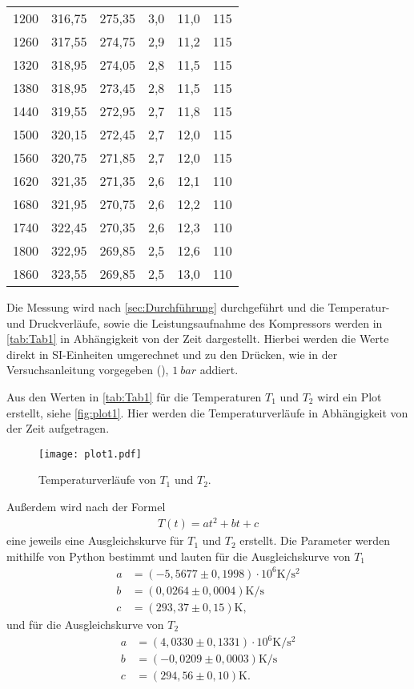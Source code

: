 \begin{table}[H]
\begin{tabular}{S[table-format=4.0] S S S[table-format=1.1] S[table-format=2.1] S[table-format=3.0]}
      1200 & 316,75 & 275,35 & 3,0 & 11,0 & 115\\
      1260 & 317,55 & 274,75 & 2,9 & 11,2 & 115\\
      1320 & 318,95 & 274,05 & 2,8 & 11,5 & 115\\
      1380 & 318,95 & 273,45 & 2,8 & 11,5 & 115\\
      1440 & 319,55 & 272,95 & 2,7 & 11,8 & 115\\
      1500 & 320,15 & 272,45 & 2,7 & 12,0 & 115\\
      1560 & 320,75 & 271,85 & 2,7 & 12,0 & 115\\
      1620 & 321,35 & 271,35 & 2,6 & 12,1 & 110\\
      1680 & 321,95 & 270,75 & 2,6 & 12,2 & 110\\
      1740 & 322,45 & 270,35 & 2,6 & 12,3 & 110\\
      1800 & 322,95 & 269,85 & 2,5 & 12,6 & 110\\
      1860 & 323,55 & 269,85 & 2,5 & 13,0 & 110\\
    \bottomrule
  \end{tabular}
\end{table}

Die Messung wird nach \autoref{sec:Durchführung} durchgeführt und die Temperatur- und Druckverläufe, sowie die Leistungsaufnahme des Kompressors
werden in \autoref{tab:Tab1} in Abhängigkeit von der Zeit dargestellt.
Hierbei werden die Werte direkt in SI-Einheiten umgerechnet und zu den Drücken, wie in der Versuchsanleitung vorgegeben (\cite{V206}),
$\qty{1}{bar}$ addiert.

Aus den Werten in \autoref{tab:Tab1} für die Temperaturen $T_1$ und $T_2$ wird ein Plot erstellt, siehe \autoref{fig:plot1}.
Hier werden die Temperaturverläufe in Abhängigkeit von der Zeit aufgetragen.

\begin{figure}
  \centering
  \texttt{[image: plot1.pdf]}
  \caption{Temperaturverläufe von $T_1$ und $T_2$.}
  \label{fig:plot1}
\end{figure}

Außerdem wird nach der Formel
\begin{align*}
  T(t)=at^2+bt+c
\end{align*}
eine jeweils eine Ausgleichskurve für $T_1$ und $T_2$ erstellt.
Die Parameter werden mithilfe von Python bestimmt und lauten für die Ausgleichskurve von $T_1$
\begin{align*}
  a&= (-5,5677 \pm 0,1998) \cdot 10^6 \si{\kelvin\per\second\squared}\\
  b&= (0,0264 \pm 0,0004) \si{\kelvin\per\second}\\
  c&= (293,37 \pm 0,15) \si{\kelvin},
\end{align*}
und für die Ausgleichskurve von $T_2$
\begin{align*}
  a&= (4,0330 \pm 0,1331) \cdot 10^6 \si{\kelvin\per\second\squared}\\
  b&= (-0,0209 \pm 0,0003) \si{\kelvin\per\second}\\
  c&= (294,56 \pm 0,10) \si{\kelvin}.
\end{align*}


